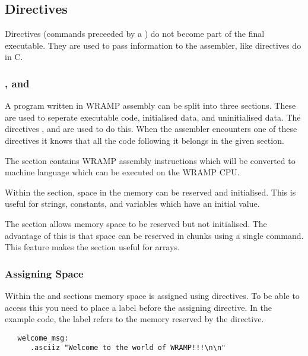 \subsection{Directives}
Directives (commands preceeded by a ) do not become part of the
final executable.  They are used to pass information to the assembler,
like \src{\#} directives do in C.

\subsubsection{\text, \data and \bss}
A program written in WRAMP assembly can be split into three sections.
These are used to seperate executable code, initialised data, and
uninitialised data.  The directives \text, \data and \bss are used to
do this.  When the assembler encounters one of these directives it
knows that all the code following it belongs in the given section.

The \text section contains WRAMP assembly instructions which will be
converted to machine language which can be executed on the WRAMP CPU.

Within the \data section, space in the memory can be reserved and
initialised.  This is useful for strings, constants, and variables
which have an initial value.

The \bss section allows memory space to be reserved but not initialised.  The
advantage of this is that space can be reserved in chunks using a single
command.  This feature makes the \bss section useful for arrays. 

\subsubsection{Assigning Space}
Within the \data and \bss sections memory space is assigned using directives. 
To be able
to access this you need to place a label before the assigning directive. In the
example code, the label  refers to the memory reserved 
by the \asciiz directive.
%
\begin{verbatim}
   welcome_msg:
      .asciiz "Welcome to the world of WRAMP!!!\n\n"
\end{verbatim}



